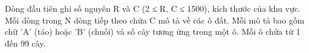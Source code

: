 Dòng đầu tiên ghi số nguyên R và C (2 ≤ R, C ≤ 1500), kích thước của khu vực. Mỗi dòng trong N dòng tiếp theo chứa C mô tả về các ô đất. Mỗi mô tả bao gồm chữ 'A' (táo) hoặc 'B' (chuối) và số cây tương ứng trong một ô. Mỗi ô chứa từ 1 đến 99 cây.  

\
